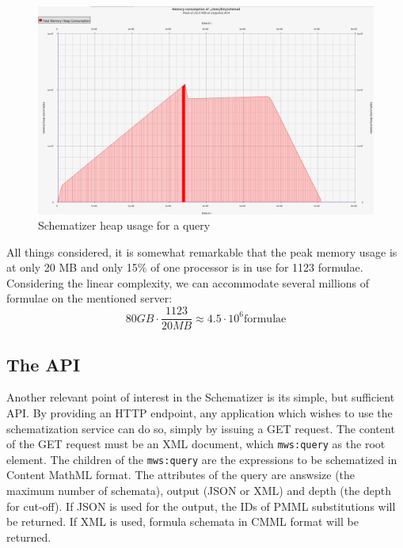 \documentclass[a4paper,oneside]{article}
\def\cmml{\textsf{Content MathML}\xspace}
\def\xml{\textsf{XML}\xspace}
\begin{document}
\begin{figure}[ht]\centering
    \includegraphics[width=12.8cm]{img/heapUsage.png}
    \caption{Schematizer heap usage for a query}\label{fig:heap_usage}
\end{figure}
\FloatBarrier

All things considered, it is somewhat remarkable that the peak memory usage
is at only 20 MB and only 15\% of one processor is in use for 1123 formulae.
Considering the linear complexity, we can accommodate several millions of
formulae on the mentioned server:
$$80 GB \cdot \frac{1123}{20 MB} \approx 4.5 \cdot {10}^{6} \text{formulae}$$

\subsection{The API}\label{subsec:schematizer_api}
Another relevant point of interest in the Schematizer is its simple, but
sufficient API. By providing an HTTP endpoint, any application which wishes to
use the schematization service can do so, simply by issuing a GET request.
The content of the GET request must be an \xml document, which \verb|mws:query|
as the root element. The children of the \verb|mws:query| are the expressions
to be schematized in \cmml format. The attributes of the query are
\textsf{answsize} (the maximum number of schemata), \textsf{output} (JSON or
XML) and \textsf{depth} (the depth for cut-off).  If JSON is used for the
output, the IDs of PMML substitutions will be returned. If XML is used, formula
schemata in CMML format will be returned.
\end{document}
